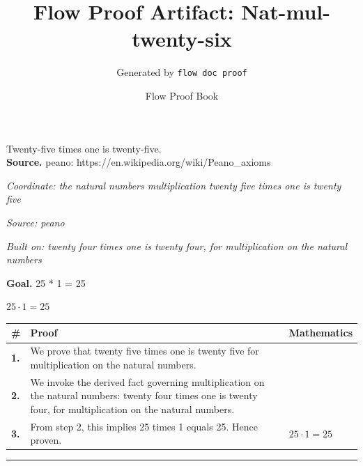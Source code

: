 \documentclass[11pt]{article}
\title{Flow Proof Artifact: Nat-mul-twenty-six}
\author{Generated by \texttt{flow doc proof}}
\date{Flow Proof Book}
\theoremstyle{definition}
\begin{document}
\maketitle
Twenty-five times one is twenty-five.\\[0.5em]
\textbf{Source.} peano: https://en.wikipedia.org/wiki/Peano\_axioms\\[0.5em]
\bigskip
{}\par
\smallskip\noindent\textit{Coordinate: the natural numbers \cdot multiplication \cdot twenty five times one is twenty five}\par
\smallskip\noindent\textit{Source: peano}\par
\smallskip\noindent\textit{Built on: twenty four times one is twenty four, for multiplication on the natural numbers}\par
\medskip
\noindent\textbf{Goal.} 25 * 1 = 25\par
\noindent$\displaystyle 25 \cdot 1 = 25$\par
\medskip
\noindent
\begin{tabular}{@{} >{\raggedright\arraybackslash}p{} >{\raggedright\arraybackslash}p{} >{\raggedleft\arraybackslash}p{} @{}}
\textbf{\#} & \textbf{Proof} & \textbf{Mathematics} \\
\midrule
\textbf{1.} & We prove that twenty five times one is twenty five for multiplication on the natural numbers. & \\[0.45em]
\textbf{2.} & We invoke the derived fact governing multiplication on the natural numbers: twenty four times one is twenty four, for multiplication on the natural numbers. & \\[0.45em]
\textbf{3.} & From step 2, this implies 25 times 1 equals 25. Hence proven. & $\displaystyle 25 \cdot 1 = 25$ \\[0.45em]
\bottomrule
\end{tabular}
\label{thm:Nat-multiplication-twenty_five_times_one_is_twenty_five}
\par\medskip\hrule
\end{document}
